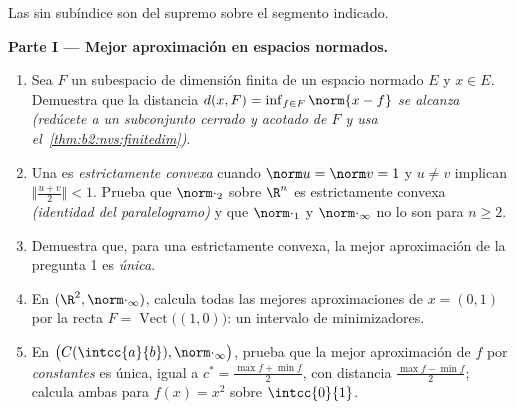 \begin{problem}
\label{pb:b2:nvs:1}
Las  sin subíndice son  del supremo sobre el segmento
indicado.

\medskip
\noindent\textbf{Parte I --- Mejor aproximación en espacios
normados.}
\begin{enumerate}
  \item Sea $F$ un subespacio de dimensión finita de un espacio
        normado $E$ y $x \in E$. Demuestra que la distancia $d(x, F)
        = \inf_{f \in F}\norm{x - f}$ \emph{se alcanza}
        \emph{(redúcete a un subconjunto cerrado y acotado de $F$ y
        usa el~\cref{thm:b2:nvs:finitedim})}.
  \item Una  es \emph{estrictamente convexa} cuando $\norm u =
        \norm v = 1$ y $u \neq v$ implican $\bigl\Vert\frac{u +
        v}2\bigr\Vert < 1$. Prueba que $\norm\cdot_2$ sobre $\R^n$
        es estrictamente convexa \emph{(identidad del
        paralelogramo)} y que $\norm\cdot_1$ y $\norm\cdot_\infty$
        no lo son para $n \geq 2$.
  \item Demuestra que, para una  estrictamente convexa, la
        mejor aproximación de la pregunta 1 es \emph{única}.
  \item En $(\R^2, \norm\cdot_\infty)$, calcula todas las mejores
        aproximaciones de $x = (0, 1)$ por la recta $F =
        \operatorname{Vect}\bigl((1,0)\bigr)$: un intervalo de
        minimizadores.
  \item En $\bigl(C(\intcc{a}{b}), \norm\cdot_\infty\bigr)$, prueba
        que la mejor aproximación de $f$ por \emph{constantes} es
        única, igual a $c^* = \frac{\max f + \min f}{2}$, con
        distancia $\frac{\max f - \min f}{2}$; calcula ambas para
        $f(x) = x^2$ sobre $\intcc{0}{1}$.
\end{enumerate}


\end{problem}
